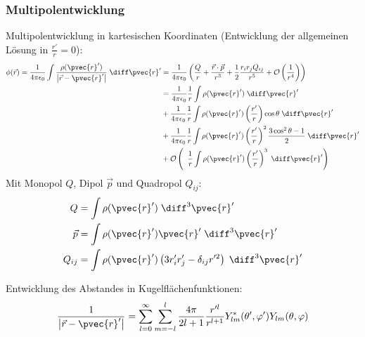 \documentclass[11pt]{article}
\numberwithin{equation}{section}
\begin{document}
      \subsubsection{Multipolentwicklung}
        Multipolentwicklung in kartesischen Koordinaten (Entwicklung der allgemeinen Lösung in $\frac{r'}{r}=0$):
        \begin{equation}
          \begin{aligned}
            \phi(\vec{r}) = \frac{1}{4\pi\epsilon_0}\int\frac{\rho(\pvec{r}')}{\left|\vec{r}-\pvec{r}'\right|}\;\diff \pvec{r}'
            &= \frac{1}{4\pi\epsilon_0}\left(\frac{Q}{r} + \frac{\vec{r}\cdot\vec{p}}{r^3} + \frac{1}{2}\frac{r_i r_j Q_{ij}}{r^5} + \mathcal{O} \left(\frac{1}{r^4}\right)\right) \\
            &= \frac{1}{4\pi\epsilon_0}\frac{1}{r}\int\rho(\pvec{r}')\;\diff \pvec{r}' \\
            &+ \frac{1}{4\pi\epsilon_0}\frac{1}{r}\int\rho(\pvec{r}')\left(\frac{r'}{r}\right)\cos\theta\;\diff \pvec{r}' \\
            &+ \frac{1}{4\pi\epsilon_0}\frac{1}{r}\int\rho(\pvec{r}')\left(\frac{r'}{r}\right)^2\frac{3\cos^2\theta-1}{2}\;\diff \pvec{r}' \\
            &+ \mathcal{O}\left(\;\;\frac{1}{r}\int\rho(\pvec{r}')\left(\frac{r'}{r}\right)^3 \;\diff \pvec{r}'\right) \\
          \end{aligned}
        \end{equation}
        Mit Monopol $Q$, Dipol $\vec{p}$ und Quadropol $Q_{ij}$:
        \begin{equation}
          \begin{aligned}
            Q &= \int \rho(\pvec{r}') \;\diff^3 \pvec{r}' \\
            \vec{p} &= \int \rho(\pvec{r}')\pvec{r}' \;\diff^3 \pvec{r}' \\
            Q_{ij} &= \int \rho(\pvec{r}')\left(3r'_i r'_j - \delta_{ij} r'^2 \right)  \;\diff^3 \pvec{r}' \\
          \end{aligned}
        \end{equation}

        Entwicklung des Abstandes in Kugelflächenfunktionen:
        \begin{equation}
          \frac{1}{\left|\vec{r}-\pvec{r}'\right|}=\sum_{l=0}^{\infty}\sum_{m=-l}^{l} \frac{4\pi}{2l+1}\frac{r'^l}{r^{l+1}} Y^{*}_{lm}(\theta',\varphi')Y_{lm}(\theta,\varphi)
        \end{equation}
\end{document}

